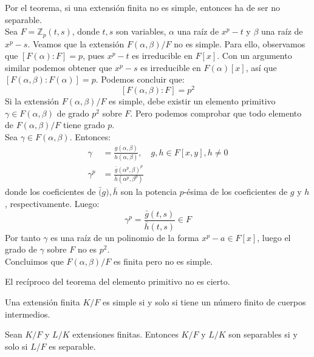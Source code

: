 \begin{example}
    Por el teorema, si una extensión finita no es simple, entonces ha de ser no separable.\\
    Sea $F = \mathbb{Z}_p(t, s)$, donde $t, s$ son variables, $\alpha$ una raíz de $x^p-t$ y $\beta$ una raíz de $x^p-s$.
    Veamos que la extensión $F(\alpha, \beta)/F$ no es simple.
    Para ello, observamos que $[F(\alpha) : F] = p$, pues $x^p-t$ es irreducible en $F[x]$.
    Con un argumento similar podemos obtener que $x^p-s$ es irreducible en $F(\alpha)[x]$, así que $[F(\alpha, \beta) : F(\alpha)] = p$.
    Podemos concluir que:
    $$[F(\alpha, \beta) : F] = p^2$$
    Si la extensión $F(\alpha, \beta)/F$ es simple, debe existir un elemento primitivo $\gamma \in F(\alpha, \beta)$ de grado $p^2$ sobre $F$.
    Pero podemos comprobar que todo elemento de $F(\alpha, \beta)/F$ tiene grado $p$.\\
    Sea $\gamma \in F(\alpha, \beta)$. Entonces:
    \begin{align*}
        \gamma   & = \frac{g(\alpha, \beta)}{h(\alpha, \beta)}, \quad g, h \in F[x, y], h \neq 0 \\
        \gamma^p & = \frac{\bar{g}(\alpha^p, \beta)^p}{\bar{h}(\alpha^p, \beta^p)}
    \end{align*}
    donde los coeficientes de $\bar(g), \bar{h}$ son la potencia $p$-ésima de los coeficientes de $g$ y $h$, respectivamente. Luego:
    $$\gamma^p = \frac{\bar{g}(t, s)}{\bar{h}(t, s)} \in F$$
    Por tanto $\gamma$ es una raíz de un polinomio de la forma $x^p - a \in F[x]$, luego el grado de $\gamma$ sobre $F$ no es $p^2$.\\
    Concluimos que $F(\alpha, \beta)/F$ es finita pero no es simple.
\end{example}

\begin{remark}
    El recíproco del teorema del elemento primitivo no es cierto.
\end{remark}

\begin{theorem}[Steiniz]
    Una extensión finita $K/F$ es simple si y solo si tiene un número finito de cuerpos intermedios.
\end{theorem}

\begin{proposition}
    Sean $K/F$ y $L/K$ extensiones finitas. Entonces $K/F$ y $L/K$ son separables si y solo si $L/F$ es separable.
\end{proposition}